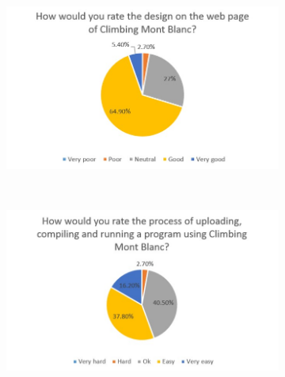 \begin{figure}
\begin{subfigure}[h]{0.4\textwidth}
        \caption{}
        \label{fig:cmb-learn}
    \end{subfigure}
    \hspace*{-1.2cm}
    \begin{subfigure}[h]{0.4\textwidth}
        \includegraphics[width=1.5\textwidth, height=1.0\textwidth]{oldresults/cmb_design.jpg}
        \caption{}
        \label{fig:cmb-design}
    \end{subfigure}
    ~ %
    \hfill
    \begin{subfigure}[h]{0.4\textwidth}
        \includegraphics[width=1.5\textwidth, height=1.0\textwidth]{oldresults/cmb_tasks.jpg}

\end{subfigure}
\end{figure}
